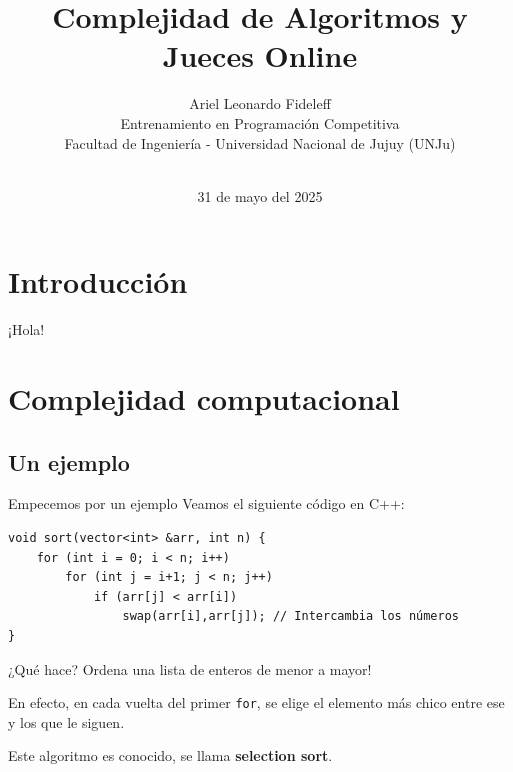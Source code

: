 \documentclass{beamer}
\title[Complejidad y Jueces Online]{Complejidad de Algoritmos y Jueces Online}
\author[Ariel Fideleff]{Ariel Leonardo Fideleff\\[2ex]\scriptsize{}Entrenamiento en Programación Competitiva\\Facultad de Ingeniería - Universidad Nacional de Jujuy (UNJu)}
\date{\\\vspace{-3ex}31 de mayo del 2025}
\begin{document}
    \frame{\titlepage}

    \begin{frame}
        \tableofcontents
    \end{frame}
    
    \section{Introducción}
    \begin{frame}
        \tableofcontents[currentsection]
    \end{frame}

    \begin{frame}
        \begin{center}
            \Huge
            ¡Hola!
        \end{center}
    \end{frame}

    \section{Complejidad computacional}
    \frame{\tableofcontents[currentsection]}

    \subsection{Un ejemplo}

    \begin{frame}[fragile]{Empecemos por un ejemplo}
        \pause
        Veamos el siguiente código en C++:\vspace{10pt}

        \pause

        \begin{verbatim}
void sort(vector<int> &arr, int n) {
    for (int i = 0; i < n; i++)
        for (int j = i+1; j < n; j++)
            if (arr[j] < arr[i])
                swap(arr[i],arr[j]); // Intercambia los números
}
        \end{verbatim}

        \pause
        ¿Qué hace? \pause Ordena una lista de enteros de menor a mayor!\vspace{8pt}

        \pause

        En efecto, en cada vuelta del primer \texttt{for}, se elige el elemento más chico entre ese y los que le siguen.\pause
        
        Este algoritmo es conocido, se llama \textbf{selection sort}.
    \end{frame}
\end{document}
